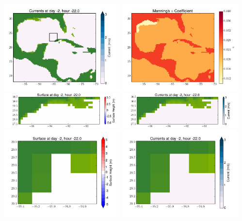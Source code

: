 \documentclass[11pt]{article}
\begin{document}
\includegraphics[width=0.475\textwidth]{frame0002fig2.png}
\vskip 10pt 
\includegraphics[width=0.475\textwidth]{frame0002fig3.png}
\includegraphics[width=0.475\textwidth]{frame0002fig4.png}
\vskip 10pt 
\includegraphics[width=0.475\textwidth]{frame0002fig5.png}
\includegraphics[width=0.475\textwidth]{frame0002fig6.png}
\vskip 10pt 
\includegraphics[width=0.475\textwidth]{frame0002fig7.png}
\end{document}
